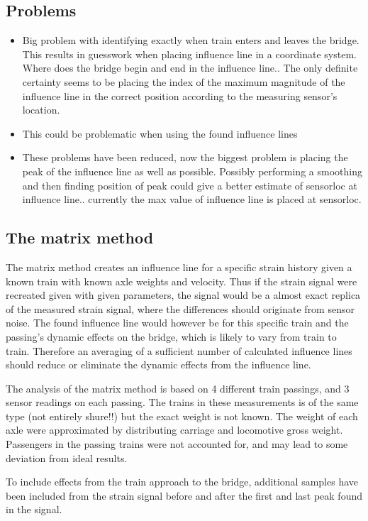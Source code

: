 \subsection{Problems}
\begin{itemize}
\item Big problem with identifying exactly when train enters and leaves the bridge. This results in guesswork when placing influence line in a coordinate system. Where does the bridge begin and end in the influence line.. The only definite certainty seems to be placing the index of the maximum magnitude of the influence line in the correct position according to the measuring sensor's location.
\item This could be problematic when using the found influence lines
\item These problems have been reduced, now the biggest problem is placing the peak of the influence line as well as possible. Possibly performing a smoothing and then finding position of peak could give a better estimate of sensorloc at influence line.. currently the max value of influence line is placed at sensorloc.
\end{itemize}


\subsection{The matrix method}
The matrix method creates an influence line for a specific strain history given a known train with known axle weights and velocity. Thus if the strain signal were recreated given with given parameters, the signal would be a almost exact replica of the measured strain signal, where the differences should originate from sensor noise. The found influence line would however be for this specific train and the passing's dynamic effects on the bridge, which is likely to vary from train to train. Therefore an averaging of a sufficient number of calculated influence lines should reduce or eliminate the dynamic effects from the influence line.

The analysis of the matrix method is based on 4 different train passings, and 3 sensor readings on each passing. The trains in these measurements is of the same type (not entirely shure!!) but the exact weight is not known. The weight of each axle were approximated by distributing carriage and locomotive gross weight. Passengers in the passing trains were not accounted for, and may lead to some deviation from ideal results.

To include effects from the train approach to the bridge, additional samples have been included from the strain signal before and after the first and last peak found in the signal.

